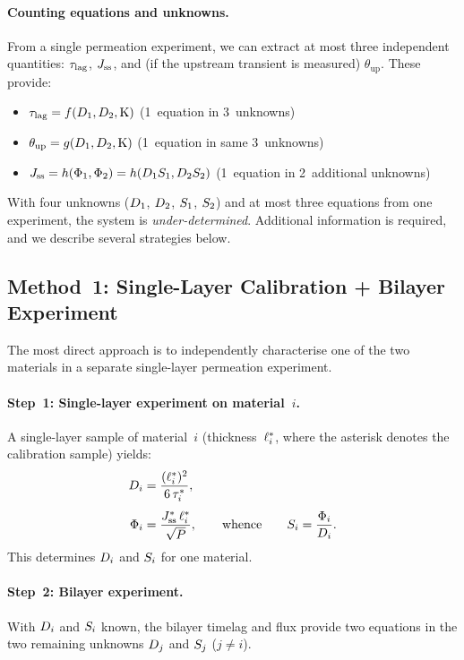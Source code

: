 \paragraph{Counting equations and unknowns.}
From a single permeation experiment, we can extract at most three independent
quantities: $\tau_{\mathrm{lag}}$, $J_{\mathrm{ss}}$, and (if the upstream transient is measured)
$\theta_{\mathrm{up}}$.  These provide:
\begin{itemize}
  \item $\tau_{\mathrm{lag}} = f(D_{1}, D_{2}, \mathrm{K})$ \hfill (1~equation in 3~unknowns)
  \item $\theta_{\mathrm{up}} = g(D_{1}, D_{2}, \mathrm{K})$
        \hfill (1~equation in same 3~unknowns)
  \item $J_{\mathrm{ss}} = h(\Phi_1, \Phi_2) = h(D_{1}S_{1}, D_{2}S_{2})$
        \hfill (1~equation in 2~additional unknowns)
\end{itemize}
With four unknowns ($D_{1}$, $D_{2}$, $S_{1}$, $S_{2}$) and at most three
equations from one experiment, the system is \emph{under-determined}.
Additional information is required, and we describe several strategies below.

\subsection{Method~1: Single-Layer Calibration + Bilayer Experiment}
\label{sec:method1}

The most direct approach is to independently characterise one of the two
materials in a separate single-layer permeation experiment.

\paragraph{Step~1: Single-layer experiment on material~$i$.}
A single-layer sample of material~$i$ (thickness~$\ell_{i}^{*}$, where the
asterisk denotes the calibration sample) yields:
\begin{align}
  \label{eq:single-cal-D}
  D_{i} &= \frac{(\ell_{i}^{*})^2}{6\,\tau_i^{*}},\\[4pt]
  \label{eq:single-cal-Phi}
  \Phi_i &= \frac{J_{\mathrm{ss}}^{*}\,\ell_{i}^{*}}{\sqrt{P}},
  \qquad\text{whence}\qquad
  S_{i} = \frac{\Phi_i}{D_{i}}.
\end{align}
This determines $D_{i}$ and $S_{i}$ for one material.

\paragraph{Step~2: Bilayer experiment.}
With $D_{i}$ and $S_{i}$ known, the bilayer timelag and flux provide two
equations in the two remaining unknowns $D_{j}$ and $S_{j}$ ($j \neq i$).

